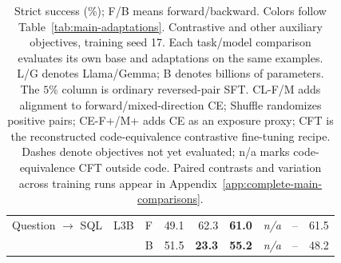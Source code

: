 \begin{table}[!t]
\begin{tabular}{lllrrrrrr}
\addlinespace[2pt]
Question $\to$ SQL & L3B & F & 49.1 & 62.3 & \textcolor{blue!60!black}{\textbf{61.0}} & \textit{n/a} & -- & 61.5 \\
 &  & B & 51.5 & \textcolor{red!70!black}{\textbf{23.3}} & \textcolor{blue!60!black}{\textbf{55.2}} & \textit{n/a} & -- & 48.2 \\
\bottomrule
\end{tabular}
\caption{Strict success (\%); F/B means forward/backward. Colors follow Table~\ref{tab:main-adaptations}. Contrastive and other auxiliary objectives, training seed 17. Each task/model comparison evaluates its own base and adaptations on the same examples. L/G denotes Llama/Gemma; B denotes billions of parameters. The $5\%$ column is ordinary reversed-pair SFT. CL-F/M adds alignment to forward/mixed-direction CE; Shuffle randomizes positive pairs; CE-F+/M+ adds CE as an exposure proxy; CFT is the reconstructed code-equivalence contrastive fine-tuning recipe. Dashes denote objectives not yet evaluated; n/a marks code-equivalence CFT outside code. Paired contrasts and variation across training runs appear in Appendix~\ref{app:complete-main-comparisons}.}\label{tab:main-loss-baselines}
\end{table}
